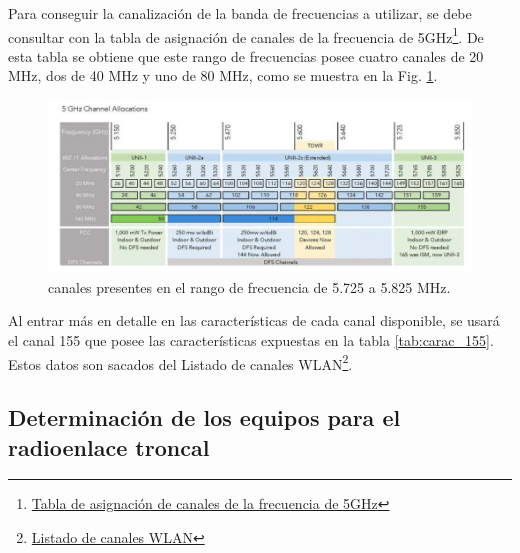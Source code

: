 \documentclass[11pt,a4paper]{article}
\begin{document}
Para conseguir la canalización de la banda de frecuencias a utilizar, se debe consultar con la tabla de asignación de canales de la frecuencia de 5GHz\footnote{\href{https://www.ekahau.com/blog/channel-planning-best-practices-for-better-wi-fi/}{Tabla de asignación de canales de la frecuencia de 5GHz}}. 
De esta tabla se obtiene que este rango de frecuencias posee cuatro canales de 20 MHz, dos de 40 MHz y uno de 80 MHz, como se muestra en la Fig. \ref{fig:canales_frec}.

\begin{figure}[htbp]
\centering
\includegraphics[width=\linewidth]{fotos_ema/canales_frec}
\caption{canales presentes en el rango de frecuencia de 5.725 a 5.825 MHz.}
\label{fig:canales_frec}
\end{figure}

 Al entrar más en detalle en las características de cada canal disponible, se usará el canal 155 que posee las características expuestas en la tabla \ref{tab:carac_155}. 
 Estos datos son sacados del Listado de canales WLAN\footnote{\href{https://en.m.wikipedia.org/wiki/List_of_WLAN_channels}{Listado de canales WLAN}}.

\begin{table}[htbp]
\caption{características del canal 155.}
\label{tab:carac_155}
\end{table}

\subsection{Determinación de los equipos para el radioenlace troncal}
\end{document}
